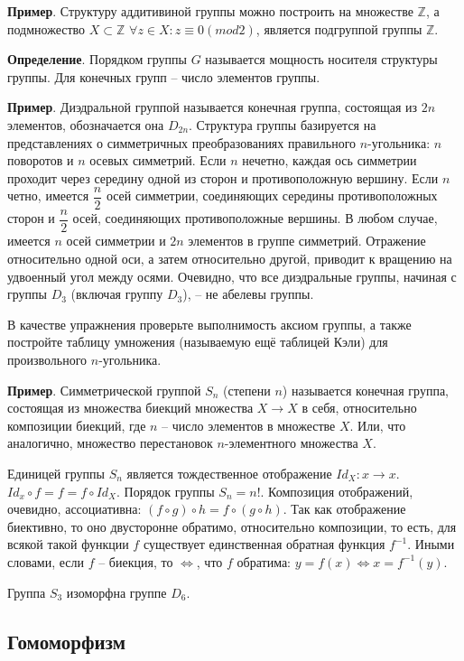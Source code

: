 \documentclass[a4paper]{book}
\begin{document}
\textbf{Пример}. Структуру аддитивиной группы можно построить на множестве $\mathbb{Z}$, а подмножество $X\subset \mathbb{Z}$ $\forall z\in X: z\equiv 0 (mod 2)$, является подгруппой группы $\mathbb{Z}$. 

\textbf{Определение}. Порядком группы $G$ называется мощность носителя структуры группы. Для конечных групп -- число элементов группы. 

\textbf{Пример}. Диэдральной группой называется конечная группа, состоящая из $2n$ элементов, обозначается она $D_{2n}$. Структура группы базируется на представлениях о симметричных преобразованиях правильного $n$-угольника: $n$ поворотов и $n$ осевых симметрий.  Если $n$ нечетно, каждая ось симметрии проходит через середину одной из сторон и противоположную вершину. Если $n$ четно, имеется $\dfrac{n}{2}$ осей симметрии, соединяющих середины противоположных сторон и $\dfrac{n}{2}$ осей, соединяющих противоположные вершины. В любом случае, имеется $n$ осей симметрии и $2n$ элементов в группе симметрий. Отражение относительно одной оси, а затем относительно другой, приводит к вращению на удвоенный угол между осями. Очевидно, что все диэдральные группы, начиная с группы $D_3$ (включая группу $D_3$), -- не абелевы группы. 

В качестве упражнения проверьте выполнимость аксиом группы, а также постройте таблицу умножения (называемую ещё таблицей Кэли) для произвольного $n$-угольника. 


\textbf{Пример}. Симметрической группой $S_n$ (степени $n$) называется конечная группа, состоящая из множества биекций множества $X \rightarrow X$ в себя, относительно композиции биекций, где $n$ -- число элементов в множестве $X$. Или, что аналогично, множество перестановок $n$-элементного множества $X$. 

Единицей группы $S_n$ является тождественное отображение $Id_X : x\rightarrow x$. $Id_x \circ f = f = f \circ Id_X$. Порядок группы $S_n = n!$. Композиция отображений, очевидно, ассоциативна: $(f\circ g) \circ h = f\circ (g\circ h)$. Так как отображение биективно, то оно двусторонне обратимо, относительно композиции, то есть, для всякой такой функции $f$ существует единственная обратная функция $f^{-1} $. Иными словами, если $f$ -- биекция, то $\Leftrightarrow$, что $f$ обратима: $y = f(x)\Leftrightarrow x =f^{-1}(y)$. 

Группа $S_3$ изоморфна группе $D_6$. 

\subsection{Гомоморфизм}
\end{document}
